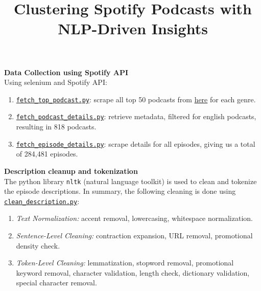 \documentclass{article}
\makeatletter
\renewcommand{\maketitle}{
    \begin{center}
        \vspace{-2em} %
        {\LARGE \textbf{\@title} \par}
        \vspace{1em} %
        {\@author \par}
        \vspace{-1em} %
        \@date
    \end{center}
}
\makeatother
\begin{document}
\title{\textbf{Clustering Spotify Podcasts with NLP-Driven Insights}}
\author{}
\date{}

\maketitle
{} %

\noindent \textbf{Data Collection using Spotify API}\\

\noindent Using selenium and Spotify API:
\begin{enumerate}
    \item \href{https://github.com/Stochastic1017/Spotify-Podcast-Clustering/blob/main/spotify_api/fetch_top_podcast.py}{\texttt{fetch\_top\_podcast.py}}: scrape all top 50 podcasts from  \href{https://podcastcharts.byspotify.com/}{here} for each genre.
    \item \href{https://github.com/Stochastic1017/Spotify-Podcast-Clustering/blob/main/spotify_api/fetch_podcast_details.py}{\texttt{fetch\_podcast\_details.py}}: retrieve metadata, filtered for english podcasts, resulting in 818 podcasts.
    \item \href{https://github.com/Stochastic1017/Spotify-Podcast-Clustering/blob/main/spotify_api/fetch_episode_details.py}{\texttt{fetch\_episode\_details.py}}: scrape details for all episodes, giving us a total of 284,481 episodes.
\end{enumerate}

\noindent \textbf{Description cleanup and tokenization}\\

\noindent The python library \texttt{nltk} (natural language toolkit) is used to clean and tokenize the episode descriptions. In summary, the following cleaning is done using \href{https://github.com/Stochastic1017/Spotify-Podcast-Clustering/blob/main/tokenization/clean_description.py}{\texttt{clean\_description.py}}:
\begin{enumerate}
    \item \textit{Text Normalization:} accent removal, lowercasing, whitespace normalization.
    \item \textit{Sentence-Level Cleaning:} contraction expansion, URL removal, promotional density check.
    \item \textit{Token-Level Cleaning:} lemmatization, stopword removal, promotional keyword removal, character validation, length check, dictionary validation, special character removal.
\end{enumerate}
\end{document}

